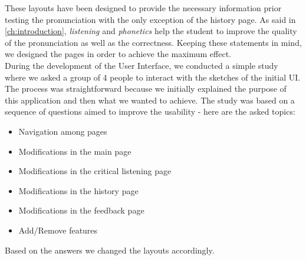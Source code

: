 \noindent These layouts have been designed to provide the necessary information prior testing the pronunciation with the only exception of the history page. As said in \ref{ch:introduction}, \textit{listening} and \textit{phonetics} help the student to improve the quality of the pronunciation as well as the correctness. Keeping these statements in mind, we designed the pages in order to achieve the maximum effect. \\

\noindent During the development of the User Interface, we conducted a simple study where we asked a group of 4 people to interact with the sketches of the initial UI. The process was straightforward because we initially explained the purpose of this application and then what we wanted to achieve. The study was based on a sequence of questions aimed to improve the usability - here are the asked topics:

\begin{itemize}
	\item Navigation among pages
	\item Modifications in the main page
	\item Modifications in the critical listening page
	\item Modifications in the history page
	\item Modifications in the feedback page	
	\item Add/Remove features
\end{itemize}

\noindent Based on the answers we changed the layouts accordingly.

